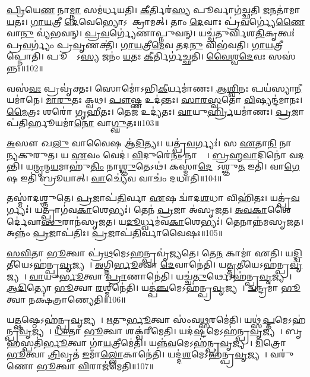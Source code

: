 \ul{𑌪𑍍𑌰𑌿}𑌯𑍇\ul{𑌣} 𑌨𑌾\ul{𑌮𑍍𑌨𑌾} 𑌸𑌮॑𑌰𑍍𑌧𑌯𑌤𑌿। 
\ul{𑌕𑍀}𑌰𑍍𑌤𑌿𑌰॑\ul{𑌸𑍍𑌯} 𑌪𑍂𑌰𑍍𑌵𑌾𑌗॑𑌚𑍍𑌛𑌤𑌿 \ul{𑌜}𑌨𑌤𑌾॑𑌮𑌾\ul{𑌯}𑌤𑌃। 
\ul{𑌗𑌾}\ul{𑌯}𑌤𑍍𑌰𑍀 \ul{𑌦𑍇}𑌵𑍇𑌭𑍍𑌯𑍋𑌽𑌪𑌾᳚𑌕𑍍𑌰𑌾𑌮𑌤𑍍। 
𑌤𑌾𑌂 \ul{𑌦𑍇}𑌵𑌾𑌃 𑌪𑍍𑌰॑\ul{𑌵}𑌰𑍍𑌗𑍍𑌯𑍇॑\ul{𑌣𑍈}𑌵𑌾\ul{𑌨𑍁} 𑌵𑍍𑌯॑𑌭𑌵𑌨𑍍। 
\ul{𑌪𑍍𑌰}\ul{𑌵}𑌰𑍍𑌗𑍍𑌯𑍇॑𑌣𑌾𑌪𑍍𑌨𑍁𑌵𑌨𑍍। 
𑌯𑌚𑍍𑌚॑𑌤𑍁𑌰𑍍𑌵𑌿𑌶\ul{𑌤𑌿}𑌕𑍃𑌤𑍍𑌵𑌃॑ 𑌪𑍍𑌰\ul{𑌵}𑌰𑍍𑌗𑍍𑌯𑌂॑ 𑌪𑍍𑌰\ul{𑌵𑍃}𑌣𑌕𑍍𑌤𑌿॑। 
\ul{𑌗𑌾}\ul{𑌯}𑌤𑍍𑌰𑍀\ul{𑌮𑍇}𑌵 𑌤𑌦\ul{𑌨𑍁} 𑌵𑌿𑌭॑𑌵𑌤𑌿। 
\ul{𑌗𑌾}\ul{𑌯}𑌤𑍍𑌰𑍀𑌮𑌾᳚𑌪𑍍𑌨𑍋𑌤𑌿। 
𑌪𑍂𑌰𑍍𑌵𑌾᳚𑌽\ul{𑌸𑍍𑌯} 𑌜𑌨𑌂॑ \ul{𑌯}𑌤𑌃 \ul{𑌕𑍀}𑌰𑍍𑌤𑌿𑌰𑍍𑌗॑𑌚𑍍𑌛𑌤𑌿। 
\ul{𑌵𑍈}\ul{𑌶𑍍𑌵}\ul{𑌦𑍇}𑌵𑌃 𑌸𑌸॑𑌨𑍍𑌨𑌃॥102॥

𑌵𑌸॑\ul{𑌵𑌃} 𑌪𑍍𑌰𑌵𑍃॑𑌕𑍍𑌤𑌃। 
𑌸𑍋𑌮𑍋॑𑌽𑌭𑌿\ul{𑌕𑍀}𑌰𑍍𑌯𑌮𑌾॑𑌣𑌃। 
\ul{𑌆}\ul{𑌶𑍍𑌵𑌿}𑌨𑌃 𑌪𑌯॑𑌸𑍍𑌯𑌾\ul{𑌨𑍀}𑌯𑌮𑌾॑𑌨𑍇। 
\ul{𑌮𑌾}\ul{𑌰𑍁}𑌤𑌃 𑌕𑍍𑌵𑌥\sn{}। 
\ul{𑌪𑍗}𑌷𑍍𑌣 𑌉𑌦॑𑌨𑍍𑌤𑌃। 
\ul{𑌸𑌾}\ul{𑌰}\ul{𑌸𑍍𑌵}𑌤𑍋 \ul{𑌵𑌿}𑌷𑍍𑌯𑌨𑍍𑌦॑𑌮𑌾𑌨𑌃। 
\ul{𑌮𑍈}𑌤𑍍𑌰𑌃  𑌶𑌰𑍋॑ 𑌗𑍃\ul{𑌹𑍀}𑌤𑌃। 
𑌤𑍇\ul{𑌜} 𑌉𑌦𑍍𑌯॑𑌤𑌃। 
\ul{𑌵𑌾}𑌯𑍁\ul{𑌰𑍍𑌹𑍍𑌰𑌿}𑌯𑌮𑌾॑𑌣𑌃। 
\ul{𑌪𑍍𑌰}𑌜𑌾𑌪॑𑌤𑌿𑌰𑍍\mbox{}\ul{𑌹𑍂}𑌯𑌮𑌾॑\ul{𑌨𑍋} 𑌵𑌾\ul{𑌗𑍍𑌘𑍁}𑌤𑌃॥103॥

\ul{𑌅}𑌸𑍗 𑌖\ul{𑌲𑍁} 𑌵𑌾𑌵𑍈𑌷 𑌆॑\ul{𑌦𑌿}𑌤𑍍𑌯𑌃। 
𑌯𑌤𑍍𑌪𑍍𑌰॑\ul{𑌵}𑌰𑍍𑌗𑍍𑌯𑌃॑। 
𑌸 \ul{𑌏}𑌤𑌾\ul{𑌨𑌿} 𑌨𑌾𑌮𑌾᳚𑌨𑍍𑌯𑌕𑍁𑌰𑍁𑌤। 
𑌯 \ul{𑌏}𑌵𑌂 𑌵𑍇𑌦॑। 
\ul{𑌵𑌿}𑌦𑍁𑌰𑍇॑\ul{𑌨𑌂} 𑌨𑌾𑌮𑍍𑌨𑌾᳚। 
\ul{𑌬𑍍𑌰}\ul{𑌹𑍍𑌮}\ul{𑌵𑌾}𑌦𑌿𑌨𑍋॑ 𑌵𑌦𑌨𑍍𑌤𑌿। 
𑌯\ul{𑌨𑍍𑌮𑍃}𑌨𑍍𑌮\ul{𑌯}𑌮𑌾𑌹𑍁॑\ul{𑌤𑌿𑌂} 𑌨𑌾\ul{𑌶𑍍𑌞𑍁}𑌤𑍇𑌽𑌥॑। 
𑌕𑌸𑍍𑌮𑌾॑\ul{𑌦𑍇}𑌷𑍋᳚𑌽𑌶𑍍𑌞𑍁\ul{𑌤} 𑌇𑌤𑌿॑। 
𑌵𑌾\ul{𑌗𑍇}𑌷 𑌇𑌤𑌿॑ 𑌬𑍍𑌰𑍂𑌯𑌾𑌤𑍍। 
\ul{𑌵𑌾}𑌚𑍍𑌯𑍇॑𑌵 𑌵𑌾𑌚𑌂॑ 𑌦𑌧𑌾𑌤𑌿॥104॥

𑌤𑌸𑍍𑌮𑌾॑𑌦𑌶𑍍𑌞𑍁𑌤𑍇। 
\ul{𑌪𑍍𑌰}𑌜𑌾𑌪॑\ul{𑌤𑌿}𑌰𑍍𑌵𑌾 \ul{𑌏}𑌷 𑌦𑍍𑌵𑌾॑𑌦\ul{𑌶}𑌧𑌾 𑌵𑌿𑌹𑌿॑𑌤𑌃। 
𑌯𑌤𑍍𑌪𑍍𑌰॑\ul{𑌵}𑌰𑍍𑌗𑍍𑌯𑌃॑। 
𑌯𑌤𑍍𑌪𑍍𑌰𑌾𑌗॑𑌵\ul{𑌕𑌾}𑌶𑍇𑌭𑍍𑌯𑌃॑। 
𑌤𑍇𑌨॑ \ul{𑌪𑍍𑌰}𑌜𑌾 𑌅॑𑌸𑍃𑌜𑌤। 
\ul{𑌅}\ul{𑌵}\ul{𑌕𑌾}𑌶𑍈𑌰𑍍𑌦𑍇॑𑌵𑌾\ul{𑌸𑍁}𑌰𑌾𑌨॑𑌸𑍃𑌜𑌤। 
𑌯\ul{𑌦𑍂}𑌰𑍍𑌧𑍍𑌵𑌮॑𑌵\ul{𑌕𑌾}𑌶𑍇𑌭𑍍𑌯𑌃॑। 
𑌤𑍇𑌨𑌾𑌨𑍍𑌨॑𑌮\-𑌸𑍃𑌜𑌤। 
𑌅𑌨𑍍𑌨𑌂॑ \ul{𑌪𑍍𑌰}𑌜𑌾𑌪॑𑌤𑌿𑌃। 
\ul{𑌪𑍍𑌰}𑌜𑌾𑌪॑\ul{𑌤𑌿}𑌰𑍍𑌵𑌾𑌵𑍈𑌷𑌃॥105॥
\anuvakamend[\ul{𑌵}\ul{𑌦}\ul{𑌨𑍍𑌤𑌿} \ul{𑌤}𑌨𑍁\ul{𑌵𑌾} 𑌸\dng{ꣳ}𑌸॑𑌨𑍍𑌨𑍋 \ul{𑌹𑍂}𑌯𑌮𑌾॑\ul{𑌨𑍋} 𑌵𑌾\ul{𑌗𑍍𑌘𑍁}𑌤𑍋 𑌦॑𑌧𑌾\ul{𑌤𑍍𑌯𑍇}𑌷𑌃]

\ul{𑌸}\ul{𑌵𑌿}𑌤𑌾 \ul{𑌭𑍂}𑌤𑍍𑌵𑌾 𑌪𑍍𑌰॑\ul{𑌥}𑌮𑍇𑌽\ul{𑌹}𑌨𑍍𑌪𑍍𑌰𑌵𑍃॑𑌜𑍍𑌯𑌤𑍇। 
𑌤𑍇\ul{𑌨} 𑌕𑌾𑌮𑌾॑ 𑌏𑌤𑌿। 
𑌯\ul{𑌦𑍍𑌦𑍍𑌵𑌿}𑌤𑍀𑌯𑍇𑌽𑌹॑𑌨𑍍𑌪𑍍𑌰\ul{𑌵𑍃}𑌜𑍍𑌯𑌤𑍇᳚। 
\ul{𑌅}𑌗𑍍𑌨𑌿\ul{𑌰𑍍𑌭𑍂}𑌤𑍍𑌵𑌾 \ul{𑌦𑍇}𑌵𑌾𑌨𑍇॑𑌤𑌿। 
𑌯\ul{𑌤𑍍𑌤𑍃}𑌤𑍀𑌯𑍇𑌽𑌹॑𑌨𑍍𑌪𑍍𑌰\-\ul{𑌵𑍃}𑌜𑍍𑌯𑌤𑍇᳚। 
\ul{𑌵𑌾}𑌯𑍁\ul{𑌰𑍍𑌭𑍂}𑌤𑍍𑌵𑌾 \ul{𑌪𑍍𑌰𑌾}𑌣𑌾𑌨𑍇॑𑌤𑌿। 
𑌯𑌚𑍍𑌚॑\ul{𑌤𑍁}𑌰𑍍𑌥𑍇𑌽𑌹॑𑌨𑍍𑌪𑍍𑌰\ul{𑌵𑍃}𑌜𑍍𑌯𑌤𑍇᳚। 
\ul{𑌆}\ul{𑌦𑌿}𑌤𑍍𑌯𑍋 \ul{𑌭𑍂}𑌤𑍍𑌵𑌾 \ul{𑌰}𑌶𑍍𑌮𑍀𑌨𑍇॑𑌤𑌿। 
𑌯𑌤𑍍𑌪॑\ul{𑌞𑍍𑌚}𑌮𑍇𑌽𑌹॑𑌨𑍍𑌪𑍍𑌰\ul{𑌵𑍃}𑌜𑍍𑌯𑌤𑍇᳚। 
\ul{𑌚}𑌨𑍍𑌦𑍍𑌰𑌮𑌾॑ \ul{𑌭𑍂}𑌤𑍍𑌵𑌾 𑌨𑌕𑍍𑌷॑𑌤𑍍𑌰𑌾𑌣𑍍𑌯𑍇𑌤𑌿॥106॥

𑌯\ul{𑌤𑍍𑌷}𑌷𑍍𑌠𑍇𑌽𑌹॑𑌨𑍍𑌪𑍍𑌰\ul{𑌵𑍃}𑌜𑍍𑌯𑌤𑍇᳚। 
\ul{𑌋}𑌤𑍁\ul{𑌰𑍍𑌭𑍂}𑌤𑍍𑌵𑌾 𑌸𑌂॑𑌵\ul{𑌥𑍍𑌸}𑌰𑌮𑍇॑𑌤𑌿। 
𑌯𑌥𑍍𑌸॑\ul{𑌪𑍍𑌤}𑌮𑍇𑌽𑌹॑𑌨𑍍𑌪𑍍𑌰\-\ul{𑌵𑍃}𑌜𑍍𑌯𑌤𑍇᳚। 
\ul{𑌧𑌾}𑌤𑌾 \ul{𑌭𑍂}𑌤𑍍𑌵𑌾 𑌶𑌕𑍍𑌵॑𑌰𑍀𑌮𑍇𑌤𑌿। 
𑌯𑌦॑\ul{𑌷𑍍𑌟}𑌮𑍇𑌽𑌹॑𑌨𑍍𑌪𑍍𑌰\ul{𑌵𑍃}𑌜𑍍𑌯𑌤𑍇᳚। 
𑌬𑍃\ul{𑌹}𑌸𑍍𑌪𑌤𑌿॑\ul{𑌰𑍍𑌭𑍂}𑌤𑍍𑌵𑌾 𑌗𑌾॑\ul{𑌯}𑌤𑍍𑌰𑍀𑌮𑍇॑𑌤𑌿। 
𑌯𑌨𑍍𑌨॑\ul{𑌵}𑌮𑍇𑌽𑌹॑𑌨𑍍𑌪𑍍𑌰\ul{𑌵𑍃}𑌜𑍍𑌯𑌤𑍇᳚। 
\ul{𑌮𑌿}𑌤𑍍𑌰𑍋 \ul{𑌭𑍂}𑌤𑍍𑌵𑌾 \ul{𑌤𑍍𑌰𑌿}𑌵𑍃𑌤॑ \ul{𑌇}𑌮𑌾𑌁\ul{𑌲𑍍𑌲𑍋}𑌕𑌾𑌨𑍇॑𑌤𑌿। 
𑌯𑌦𑍍𑌦॑\ul{𑌶}𑌮𑍇𑌽𑌹॑𑌨𑍍𑌪𑍍𑌰\ul{𑌵𑍃}𑌜𑍍𑌯𑌤𑍇᳚। 
𑌵𑌰𑍁॑𑌣𑍋 \ul{𑌭𑍂}𑌤𑍍𑌵𑌾 \ul{𑌵𑌿}𑌰𑌾𑌜॑𑌮𑍇𑌤𑌿॥107॥

